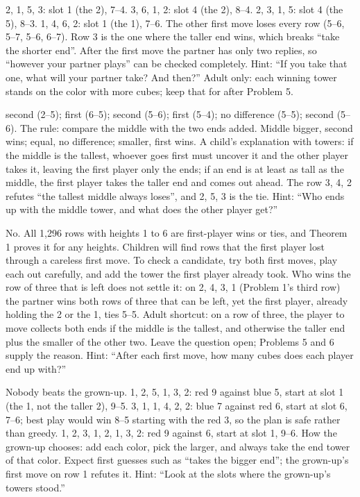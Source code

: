  2, 1, 5, 3: slot 1 (the 2), 7--4. 3, 6, 1, 2: slot 4 (the 2), 8--4. 2, 3, 1, 5: slot 4 (the 5), 8--3. 1, 4, 6, 2: slot 1 (the 1), 7--6. The other first move loses every row (5--6, 5--7, 5--6, 6--7). Row 3 is the one where the taller end wins, which breaks ``take the shorter end''. After the first move the partner has only two replies, so ``however your partner plays'' can be checked completely. Hint: ``If you take that one, what will your partner take? And then?'' Adult only: each winning tower stands on the color with more cubes; keep that for after Problem 5.

 second (2--5); first (6--5); second (5--6); first (5--4); no difference (5--5); second (5--6). The rule: compare the middle with the two ends added. Middle bigger, second wins; equal, no difference; smaller, first wins. A child's explanation with towers: if the middle is the tallest, whoever goes first must uncover it and the other player takes it, leaving the first player only the ends; if an end is at least as tall as the middle, the first player takes the taller end and comes out ahead. The row 3, 4, 2 refutes ``the tallest middle always loses'', and 2, 5, 3 is the tie. Hint: ``Who ends up with the middle tower, and what does the other player get?''

 No. All 1,296 rows with heights 1 to 6 are first-player wins or ties, and Theorem 1 proves it for any heights. Children will find rows that the first player lost through a careless first move. To check a candidate, try both first moves, play each out carefully, and add the tower the first player already took. Who wins the row of three that is left does not settle it: on 2, 4, 3, 1 (Problem 1's third row) the partner wins both rows of three that can be left, yet the first player, already holding the 2 or the 1, ties 5--5. Adult shortcut: on a row of three, the player to move collects both ends if the middle is the tallest, and otherwise the taller end plus the smaller of the other two. Leave the question open; Problems 5 and 6 supply the reason. Hint: ``After each first move, how many cubes does each player end up with?''

 Nobody beats the grown-up. 1, 2, 5, 1, 3, 2: red 9 against blue 5, start at slot 1 (the 1, not the taller 2), 9--5. 3, 1, 1, 4, 2, 2: blue 7 against red 6, start at slot 6, 7--6; best play would win 8--5 starting with the red 3, so the plan is safe rather than greedy. 1, 2, 3, 1, 2, 1, 3, 2: red 9 against 6, start at slot 1, 9--6. How the grown-up chooses: add each color, pick the larger, and always take the end tower of that color. Expect first guesses such as ``takes the bigger end''; the grown-up's first move on row 1 refutes it. Hint: ``Look at the slots where the grown-up's towers stood.''

